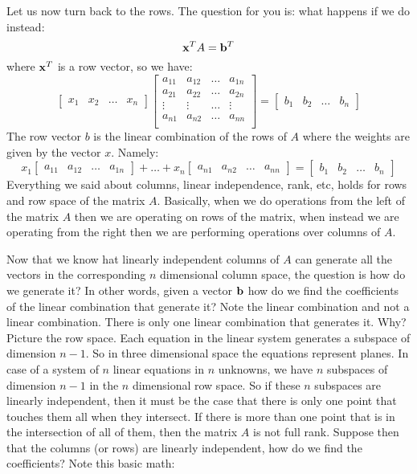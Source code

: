\documentclass[computationalMathematics.tex]{subfiles}
\begin{document}
\par Let us now turn back to the rows. The question for you is: what happens if we do instead:
\[
    {{\bf x }}^{T} A = {{\bf b }}^{T}
\]
where ${{\bf x }}^{T}$ is a row vector, so we have:
\[
    \begin{bmatrix}
        x_1 & x_2 & \dots & x_n
    \end{bmatrix}
    \begin{bmatrix}
        a_{11} & a_{12} & \dots & a_{1n} \\
        a_{21} & a_{22} & \dots & a_{2n} \\
        \vdots & \vdots & \dots & \vdots \\
        a_{n1} & a_{n2} & \dots & a_{nn} \\
    \end{bmatrix}
    = 
    \begin{bmatrix}
        b_1 & b_2 & \dots & b_n
    \end{bmatrix}
\]
The row vector $b$ is the linear combination of the rows of $A$ where the weights are given by the vector $x$. Namely:
\[
    x_1
    \begin{bmatrix}
        a_{11} & a_{12} & \dots & a_{1n}
    \end{bmatrix}
    +
    \dots
    +
    x_n
    \begin{bmatrix}
        a_{n1} & a_{n2} & \dots & a_{nn}
    \end{bmatrix}
    =
    \begin{bmatrix}
        b_1 & b_2 & \dots & b_n
    \end{bmatrix}
\]
Everything we said about columns, linear independence, rank, etc, holds for rows and row space of the matrix $A$. Basically, when we do operations from the left of the matrix $A$ then we are operating on rows of the matrix, when instead we are operating from the right then we are performing operations over columns of $A$.
\par Now that we know hat linearly independent columns of $A$ can generate all the vectors in the corresponding $n$ dimensional column space, the question is how do we generate it? In other words, given a vector ${\bf b }$ how do we find the coefficients of the linear combination that generate it? Note the linear combination and not a linear combination. There is only one linear combination that generates it. Why? Picture the row space. Each equation in the linear system generates a subspace of dimension $n-1$. So in three dimensional space the equations represent planes. In case of a system of $n$ linear equations in $n$ unknowns, we have $n$ subspaces of dimension $n-1$ in the $n$ dimensional row space. So if these $n$ subspaces are linearly independent, then it must be the case that there is only one point that touches them all when they intersect. If there is more than one point that is in the intersection of all of them, then the matrix $A$ is not full rank. Suppose then that the columns (or rows) are linearly independent, how do we find the coefficients? Note this basic math:
\end{document}

